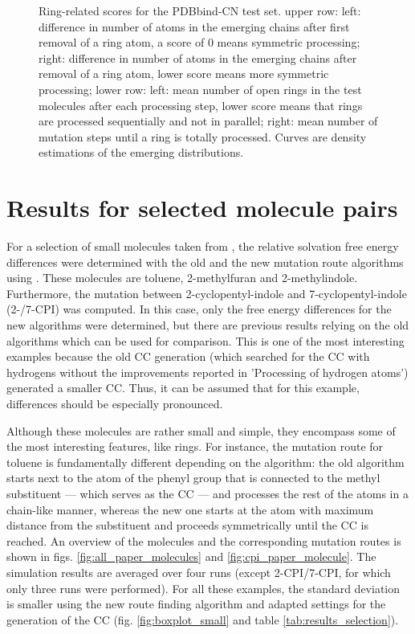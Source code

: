 \begin{figure}
	\caption{Ring-related scores for the PDBbind-CN test set. upper row: left: difference in number of atoms in the emerging chains after first removal of a ring atom, a score of 0 means symmetric processing; right: difference in number of atoms in the emerging chains after removal of a ring atom, lower score means more symmetric processing; lower row: left: mean number of open rings in the test molecules after each processing step, lower score means that rings are processed sequentially and not in parallel; right: mean number of mutation steps until a ring is totally processed. Curves are density estimations of the emerging distributions.}
	\label{fig:ring_related}
\end{figure}



\section{Results for selected molecule pairs}

For a selection of small molecules taken from \cite{Loeffler.2018, Wieder.2022}, the relative solvation free energy differences were determined with the old and the new mutation route algorithms  using {\trafo}. These molecules are toluene, 2-methylfuran and 2-methylindole.
Furthermore, the mutation between 2-cyclopentyl-indole and 7-cyclopentyl-indole (2-/7-CPI) was computed. In this case, only the free energy differences for the new algorithms were determined, but there are previous results relying on the old algorithms which can be used for comparison. This is one of the most interesting examples because the old CC generation (which searched for the CC with hydrogens without the improvements reported in 'Processing of hydrogen atoms') generated a smaller CC. Thus, it can be assumed that for this example, differences should be especially pronounced.

Although these molecules are rather small and simple, they encompass some of the most interesting features, like rings. For instance, the mutation route for toluene is fundamentally different depending on the algorithm: the old algorithm starts next to the atom of the phenyl group that is connected to the methyl substituent --- which serves as the CC --- and processes the rest of the atoms in a chain-like manner, whereas the new one starts at the atom with maximum distance from the substituent and proceeds symmetrically until the CC is reached.
An overview of the molecules and the corresponding mutation routes is shown in figs. \ref{fig:all_paper_molecules} and \ref{fig:cpi_paper_molecule}.
The simulation results are averaged over four runs (except 2-CPI/7-CPI, for which only three runs were performed). 
For all these examples, the standard deviation is smaller using the new route finding algorithm and adapted settings for the generation of the CC (fig. \ref{fig:boxplot_small} and table \ref{tab:results_selection}).

